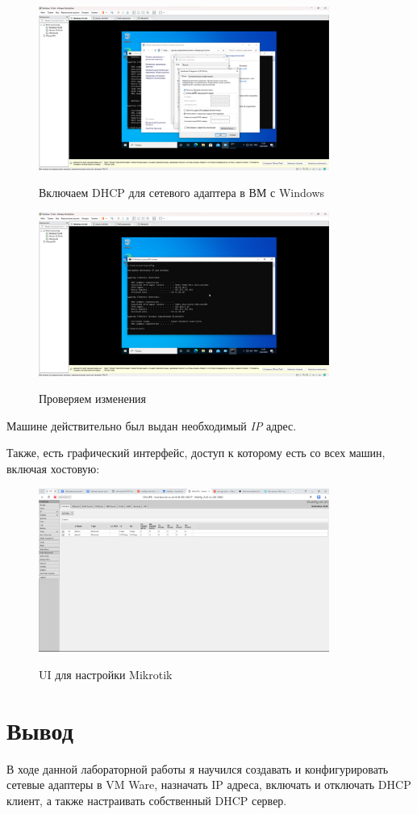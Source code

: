 \documentclass[a4paper]{article}
\begin{document}
  \begin{figure}[H]
    \centering
    \includegraphics[width=0.85\textwidth]{06_00 (111)}
    \label{img:111}
    \caption{Включаем DHCP для сетевого адаптера в ВМ с Windows}
  \end{figure}
  
  \begin{figure}[H]
    \centering
    \includegraphics[width=0.85\textwidth]{06_00 (112)}
    \label{img:112}
    \caption{Проверяем изменения}
  \end{figure}
  
  Машине действительно был выдан необходимый \textit{IP} адрес.

  Также, есть графический интерфейс, доступ к которому есть со всех машин, включая хостовую:

  \begin{figure}[H]
    \centering
    \includegraphics[width=0.85\textwidth]{06_00 (1)}
    \label{img:113}
    \caption{UI для настройки Mikrotik}
  \end{figure}


  \section{Вывод}

  В ходе данной лабораторной работы я научился создавать и конфигурировать сетевые адаптеры
  в VM Ware, назначать IP адреса, включать и отключать DHCP клиент, а также настраивать собственный
  DHCP сервер.
\end{document}
